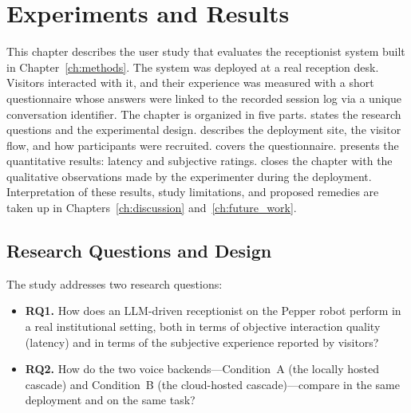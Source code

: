 \chapter{Experiments and Results}
\label{ch:experiments}


This chapter describes the user study that evaluates the receptionist system built in Chapter~\ref{ch:methods}.
The system was deployed at a real reception desk.
Visitors interacted with it, and their experience was measured with a short questionnaire whose answers were linked to the recorded session log via a unique conversation identifier.
The chapter is organized in five parts.
 states the research questions and the experimental design.
 describes the deployment site, the visitor flow, and how participants were recruited.
 covers the questionnaire.
 presents the quantitative results: latency and subjective ratings.
 closes the chapter with the qualitative observations made by the experimenter during the deployment.
Interpretation of these results, study limitations, and proposed remedies are taken up in Chapters~\ref{ch:discussion} and~\ref{ch:future_work}.


\section{Research Questions and Design}
\label{sec:exp_design}

The study addresses two research questions:

\begin{itemize}
    \item \textbf{RQ1.} How does an LLM-driven receptionist on the Pepper robot perform in a real institutional setting, both in terms of objective interaction quality (latency) and in terms of the subjective experience reported by visitors?
    \item \textbf{RQ2.} How do the two voice backends---Condition~A (the locally hosted cascade) and Condition~B (the cloud-hosted cascade)---compare in the same deployment and on the same task?
\end{itemize}

